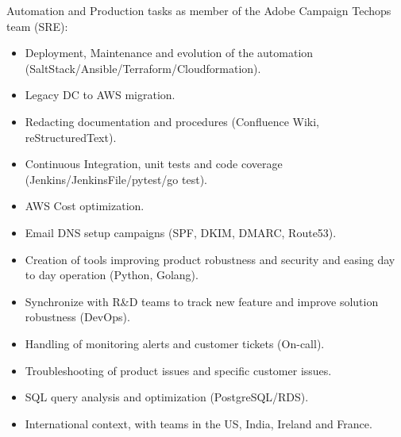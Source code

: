 \documentclass[10pt,a4paper,sans]{moderncv}        %
\begin{document}
        {}
        {}
        {}
        {Automation and Production tasks as member of the Adobe Campaign Techops team (SRE):
        \begin{itemize}
        \item Deployment, Maintenance and evolution of the automation (SaltStack/Ansible/Terraform/Cloudformation).
        \item Legacy DC to AWS migration.
        \item Redacting documentation and procedures (Confluence Wiki, reStructuredText).
        \item Continuous Integration, unit tests and code coverage (Jenkins/JenkinsFile/pytest/go test).
        \item AWS Cost optimization.
        \item Email DNS setup campaigns (SPF, DKIM, DMARC, Route53).
        \item Creation of tools improving product robustness and security and easing day to day operation (Python, Golang).
        \item Synchronize with R\&D teams to track new feature and improve solution robustness (DevOps).
        \item Handling of monitoring alerts and customer tickets (On-call).
        \item Troubleshooting of product issues and specific customer issues.
        \item SQL query analysis and optimization (PostgreSQL/RDS).
        \item International context, with teams in the US, India, Ireland and France.
        \end{itemize}
        }
\end{document}
